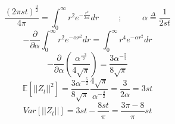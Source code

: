 \documentclass[]{article}
\begin{document}
\begin{equation}
	\nonumber
	 \frac{(2\pi st)^{\frac{3}{2}}}{4\pi} = \int_{0}^{\infty} r^2 e^{-\frac{r^2}{2st}} dr
	 \hspace{1cm} ; \hspace{1cm} \alpha \overset{\Delta}{=} \frac{1}{2st}
\end{equation}
\begin{equation}
	\nonumber
	-\frac{\partial}{\partial \alpha}\int_{0}^{\infty} r^2 e^{-\alpha r^2} dr = 
	\int_{0}^{\infty} r^4 e^{-\alpha r^2} dr
\end{equation}
\begin{equation}
	\nonumber
	-\frac{\partial}{\partial \alpha} (\frac{\alpha^{\frac{-3}{2}}}{4\sqrt{\pi}}) = 
	\frac{3\alpha^{-\frac{5}{2}}}{8\sqrt{\pi}}
\end{equation}
\begin{equation}
	\nonumber
	\mathbb{E}[||Z_t||^2] = \frac{3\alpha^{-\frac{5}{2}}}{8\sqrt{\pi}} \frac{4\sqrt{\pi}}{\alpha^{-\frac{3}{2}}} = \frac{3}{2\alpha} = 3st 
\end{equation}
\begin{equation}
	\nonumber
	Var[||Z_t||] = 3st - \frac{8st}{\pi} = \frac{3\pi - 8}{\pi} st
\end{equation}
\newpage
\end{document}
